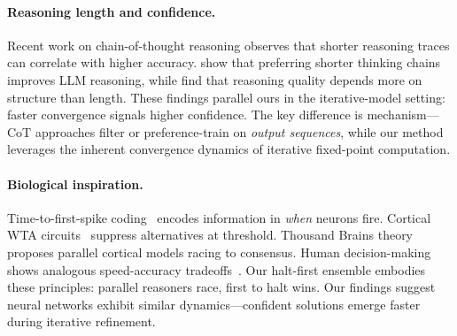 \paragraph{Reasoning length and confidence.}
Recent work on chain-of-thought reasoning observes that shorter reasoning
traces can correlate with higher accuracy.
\citet{chen2025dontoverthink} show that preferring shorter thinking chains
improves LLM reasoning, while \citet{wu2025characterizes} find that
reasoning quality depends more on structure than length. These findings
parallel ours in the iterative-model setting: faster convergence signals
higher confidence. The key difference is mechanism---CoT approaches filter
or preference-train on \emph{output sequences}, while our method leverages
the inherent convergence dynamics of iterative fixed-point computation.


\paragraph{Biological inspiration.}
Time-to-first-spike coding~\citep{thorpe2001spike, park2020t2fsnn} encodes
information in \emph{when} neurons fire. Cortical WTA
circuits~\citep{grossberg1987competitive} suppress alternatives at threshold.
Thousand Brains theory~\citep{hawkins2021thousand} proposes parallel cortical
models racing to consensus. Human decision-making shows analogous speed-accuracy
tradeoffs~\citep{heitz2014speedaccuracy, ratcliff2008diffusion}. Our halt-first
ensemble embodies these principles: parallel reasoners race, first to halt wins.
Our findings suggest neural networks exhibit similar dynamics---confident
solutions emerge faster during iterative refinement.
